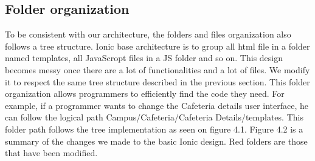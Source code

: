 \documentclass{eplmastersthesis}
\begin{document}
\subsection{Folder organization}
To be consistent with our architecture, the folders and files organization also follows a tree structure. Ionic base architecture is to group all html file in a folder named templates, all JavaScropt files in a JS folder and so on. This design becomes messy once there are a lot of functionalities and a lot of files. We modify it to respect the same tree structure described in the previous section. This folder organization allows programmers to efficiently find the code they need. For example, if a programmer wants to change the Cafeteria details user interface, he can follow the logical path Campus/Cafeteria/Cafeteria Details/templates. This folder path follows the tree implementation as seen on figure 4.1. Figure 4.2 is a summary of the changes we made to the basic Ionic design. Red folders are those that have been modified.\\ 
\end{document}

